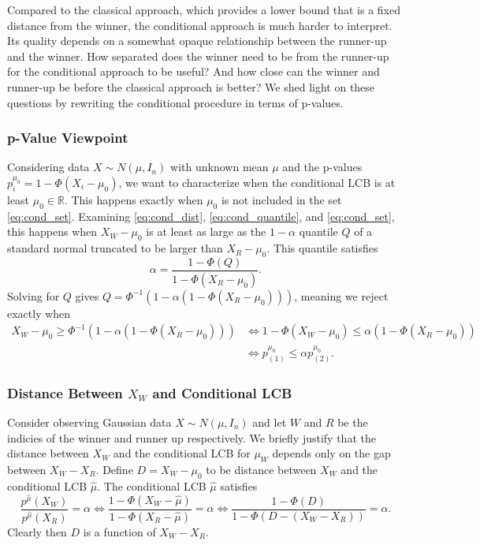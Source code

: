 \documentclass{article}
\newcommand{\R}{\mathbb{R}}
\begin{document}
\begin{appendix}
Compared to the classical approach, which provides a lower bound that is a fixed distance from the winner, the conditional approach is much harder to interpret. Its quality depends on a somewhat opaque relationship between the runner-up and the winner. How separated does the winner need to be from the runner-up for the conditional approach to be useful? And how close can the winner and runner-up be before the classical approach is better? We shed light on these questions by rewriting the conditional procedure in terms of p-values. 

\subsubsection{p-Value Viewpoint }
\label{sec:cond_appdx}

Considering data $X \sim N(\mu, I_n)$ with unknown mean $\mu$ and the p-values $p^{\mu_0
}_i = 1 - \Phi(X_i - \mu_0)$, we want to characterize when the conditional LCB is at least $\mu_0 \in \R$. This happens exactly when $\mu_0$ is not included in the set \eqref{eq:cond_set}. Examining \eqref{eq:cond_dist}, \eqref{eq:cond_quantile}, and \eqref{eq:cond_set}, this happens when $X_W - \mu_0$ is at least as large as the $1-\alpha$ quantile $Q$ of a standard normal truncated to be larger than $X_R - \mu_0$. This quantile satisfies 
    \begin{equation*}
        \alpha = \frac{1 - \Phi(Q) }{1 - \Phi(X_R - \mu_0) }.
    \end{equation*}
Solving for $Q$ gives $Q = \Phi^{-1}(1 - \alpha(1 - \Phi(X_R - \mu_0)))$, meaning we reject exactly when 
\begin{align*}
    X_{W} - \mu_0 \geq \Phi^{-1}(1 - \alpha(1 - \Phi(X_{R} - \mu_0))) &\iff 1 - \Phi(X_{W} - \mu_0) \leq \alpha(1 - \Phi(X_{R} - \mu_0))\\
    &\iff p^{\mu_0}_{(1)} \leq \alpha p^{\mu_0}_{(2)}.
\end{align*}

\subsubsection{Distance Between $X_W$ and Conditional LCB }
\label{sec:gap_appdx}

Consider observing Gaussian data $X \sim N(\mu, I_n)$ and let $W$ and $R$ be the indicies of the winner and runner up respectively. We briefly justify that the distance between $X_W$ and the conditional LCB for $\mu_W$ depends only on the gap between $X_W - X_R$. Define $D = X_W - \mu_0$ to be distance between $X_W$ and the conditional LCB $\hat{\mu}$. The conditional LCB $\hat{\mu}$ satisfies 
\begin{equation*}
    \frac{p^{\hat{\mu}}(X_W)}{p^{\hat{\mu}}(X_R)} = \alpha \iff \frac{1 - \Phi(X_W - \hat{\mu})}{1 - \Phi(X_R - \hat{\mu})} = \alpha \iff \frac{1 - \Phi(D)}{1 - \Phi(D - (X_W - X_R))} =\alpha.
\end{equation*}
Clearly then $D$ is a function of $X_W - X_R$.


\end{appendix}
\end{document}
